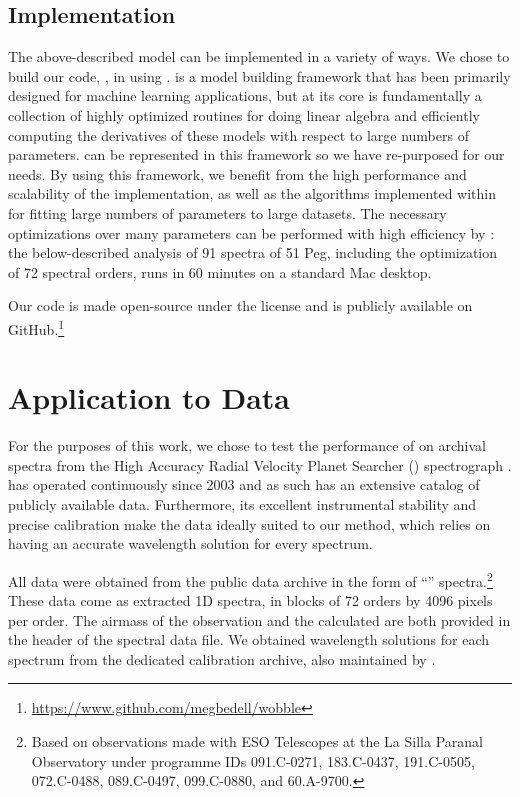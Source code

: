 \documentclass[twocolumn]{aastex62}
\begin{document}
\subsection{Implementation}
\label{s:implementation}

The above-described model can be implemented in a variety of ways. We chose to build our code, \wobble, in  using \TF \citep{Abadi15}. 
\TF is a model building framework that has been primarily designed for machine
learning applications, but at its core \TF is fundamentally a collection of
highly optimized routines for doing linear algebra and efficiently computing the
derivatives of these models with respect to large numbers of parameters.
\wobble can be represented in this framework so we have re-purposed \TF for our
needs.
By using this framework, we benefit from the high performance and scalability
of the implementation, as well as the algorithms implemented within \TF for
fitting large numbers of parameters to large datasets.
The necessary optimizations over many parameters can be performed with high efficiency by \TF: the below-described analysis of 91 \HARPS spectra of 51 Peg, including the optimization of 72 spectral orders, runs in 60 minutes on a standard Mac desktop.

Our code is made open-source under the  license and is publicly available on GitHub.\footnote{\url{https://www.github.com/megbedell/wobble}}



\section{Application to \HARPS Data}
\label{s:results}

For the purposes of this work, we chose to test the performance of \wobble on archival spectra from the High Accuracy Radial Velocity Planet Searcher (\HARPS) spectrograph \citep{Mayor2003}. 
\HARPS has operated continuously since 2003 and as such has an extensive catalog of publicly available data. 
Furthermore, its excellent instrumental stability and precise calibration make the data ideally suited to our method, which relies on having an accurate wavelength solution for every spectrum. 

All data were obtained from the  public data archive in the form of ``'' spectra.\footnote{Based on observations made with ESO Telescopes at the La Silla Paranal Observatory under programme IDs 091.C-0271, 183.C-0437, 191.C-0505, 072.C-0488, 089.C-0497, 099.C-0880, and 60.A-9700.} 
These data come as extracted 1D spectra, in blocks of 72 orders by 4096 pixels per order.
The airmass of the observation and the calculated \BERV are both provided in the  header of the spectral data file. 
We obtained wavelength solutions for each spectrum from the dedicated \HARPS calibration archive, also maintained by .
\end{document}
